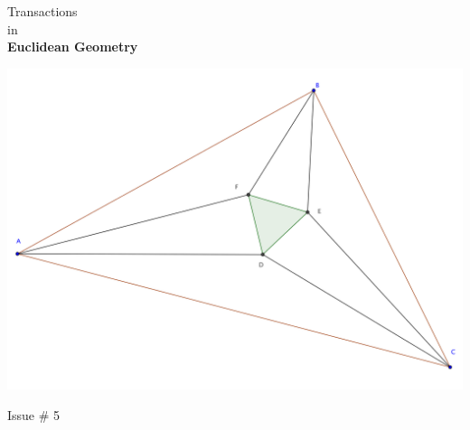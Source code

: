 \documentclass{report}
\begin{document}
\thispagestyle{empty}
\begin{center}
{\Huge Transactions\\ in\\ \textbf{Euclidean Geometry}}

\vspace{1in}

\includegraphics[width=1.1\textwidth]{cover-image.png}



\vfill
{\Huge Issue \# 5}
\end{center}
\end{document}

